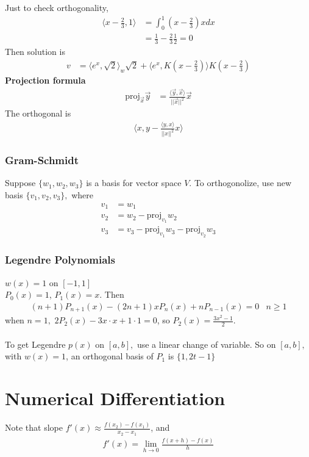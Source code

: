 \documentclass[11pt,oneside]{book}
\theoremstyle{break}
\theoremstyle{break}
\begin{document}
Just to check orthogonality, \begin{align*}
\langle x-\frac{2}{3},1\rangle&= \int_{0}^{1}\left(x-\frac{2}{3} \right)xdx\\
&=\frac{1}{3}-\frac{2}{3}\frac{1}{2}=0
\end{align*}
Then solution is \begin{align*}
v&=\langle e^x,\sqrt{2}\rangle_{w}\sqrt{2}+\langle e^x,K\left(x-\frac{2}{3} \right)\rangle K\left(x-\frac{2}{3} \right)
\end{align*}
\textbf{Projection formula}\begin{align*}
\text{proj}_{\vec{x}}\vec{y}&=\frac{\langle \vec{y},\vec{x}\rangle}{||\vec{x}||^2}\vec{x}
\end{align*}
The orthogonal is \begin{align*}
\langle x,y-\frac{\langle y,x\rangle}{||x||^2}x\rangle
\end{align*}
\subsection[Gram-Schmidt]{Gram-Schmidt}
Suppose $\{w_1,w_2,w_3\}$ is a basis for vector space $V$. To orthogonolize, use new basis $\{v_1,v_2,v_3\},$ where \begin{align*}
v_1&=w_1\\
v_2&=w_2-\text{proj}_{v_1}w_2\\
v_3&=v_3-\text{proj}_{v_1}w_3-\text{proj}_{v_2}w_3
\end{align*}
\subsection[Legendre Polynomials]{Legendre Polynomials}
$w(x)=1$ on $[-1,1]$\\
$P_0(x)=1$, $P_1(x)=x$. Then \begin{align*}
(n+1)P_{n+1}(x)-(2n+1)xP_n(x)+nP_{n-1}(x)=0 &n\geq 1
\end{align*}
when $n=1,$ $2P_2(x)-3x\cdot x+1\cdot 1=0$, so $P_2(x)=\frac{3x^2-1}{2}$.\\
\hfill\\
To get Legendre $p(x)$ on $[a,b],$ use a linear change of variable. So on $[a,b],$ with $w(x)=1$, an orthogonal basis of $P_1$ is $\{1,2t-1\}$
\chapter[Numerical Differentiation]{Numerical Differentiation}
Note that slope $f'(x)\approx \frac{f(x_2)-f(x_1)}{x_2-x_1}$, and \begin{align*}
f'(x)=\lim_{h\to 0}\frac{f(x+h)-f(x)}{h}
\end{align*}
\end{document}
